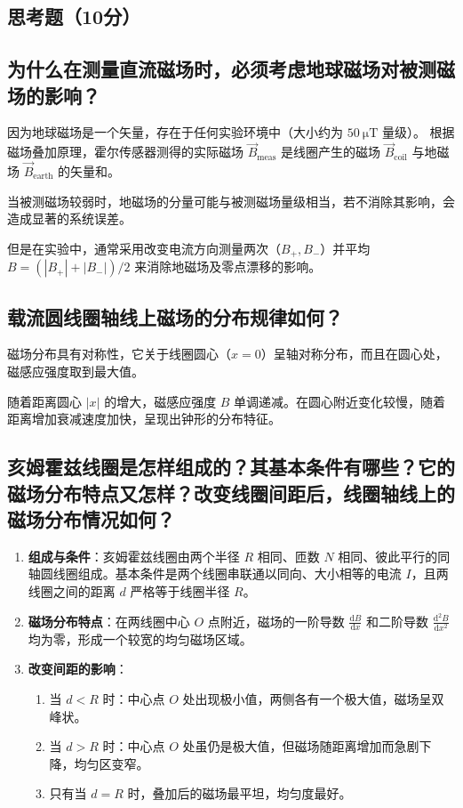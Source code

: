 \documentclass{../template/Report}%
\begin{document}
\begin{fullreportonly}
    \section{思考题（10分）}

    \subsection{为什么在测量直流磁场时，必须考虑地球磁场对被测磁场的影响？}
    因为地球磁场是一个矢量，存在于任何实验环境中（大小约为 $\SI{50}{\micro\tesla}$ 量级）。
    根据磁场叠加原理，霍尔传感器测得的实际磁场 $\vec{B}_{\text{meas}}$ 是线圈产生的磁场 $\vec{B}_{\text{coil}}$ 与地磁场 $\vec{B}_{\text{earth}}$ 的矢量和。

    当被测磁场较弱时，地磁场的分量可能与被测磁场量级相当，若不消除其影响，会造成显著的系统误差。

    但是在实验中，通常采用改变电流方向测量两次（$B_+, B_-$）并平均 $B = (|B_+| + |B_-|)/2$ 来消除地磁场及零点漂移的影响。

    \subsection{载流圆线圈轴线上磁场的分布规律如何？}
    磁场分布具有对称性，它关于线圈圆心（$x=0$）呈轴对称分布，而且在圆心处，磁感应强度取到最大值。

    随着距离圆心 $|x|$ 的增大，磁感应强度 $B$ 单调递减。在圆心附近变化较慢，随着距离增加衰减速度加快，呈现出钟形的分布特征。

    \subsection{亥姆霍兹线圈是怎样组成的？其基本条件有哪些？它的磁场分布特点又怎样？改变线圈间距后，线圈轴线上的磁场分布情况如何？}
    \begin{enumerate}
        \item \textbf{组成与条件}：亥姆霍兹线圈由两个半径 $R$ 相同、匝数 $N$ 相同、彼此平行的同轴圆线圈组成。基本条件是两个线圈串联通以同向、大小相等的电流 $I$，且两线圈之间的距离 $d$ 严格等于线圈半径 $R$。
        \item \textbf{磁场分布特点}：在两线圈中心 $O$ 点附近，磁场的一阶导数 $\frac{\textrm{d}B}{\textrm{d}x}$ 和二阶导数 $\frac{\textrm{d}^2B}{\textrm{d}x^2}$ 均为零，形成一个较宽的均匀磁场区域。
        \item \textbf{改变间距的影响}：
              \begin{enumerate}
                  \item 当 $d < R$ 时：中心点 $O$ 处出现极小值，两侧各有一个极大值，磁场呈双峰状。
                  \item 当 $d > R$ 时：中心点 $O$ 处虽仍是极大值，但磁场随距离增加而急剧下降，均匀区变窄。
                  \item 只有当 $d = R$ 时，叠加后的磁场最平坦，均匀度最好。
              \end{enumerate}
    \end{enumerate}


\end{fullreportonly}
\end{document}
